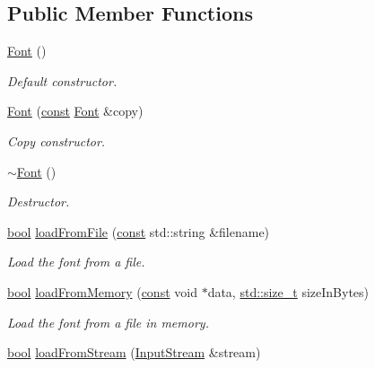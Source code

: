 \subsection*{Public Member Functions}
\begin{DoxyCompactItemize}
\item 
\hyperlink{classsf_1_1_font_a506404655b8869ed60d1e7709812f583}{Font} ()
\begin{DoxyCompactList}\small\item\em Default constructor. \end{DoxyCompactList}\item 
\hyperlink{classsf_1_1_font_a72d7322b355ee2f1be4500f530e98081}{Font} (\hyperlink{term__entry_8h_a57bd63ce7f9a353488880e3de6692d5a}{const} \hyperlink{classsf_1_1_font}{Font} \&copy)
\begin{DoxyCompactList}\small\item\em Copy constructor. \end{DoxyCompactList}\item 
\hyperlink{classsf_1_1_font_aa18a3c62e6e01e9a21c531b5cad4b7f2}{$\sim$\-Font} ()
\begin{DoxyCompactList}\small\item\em Destructor. \end{DoxyCompactList}\item 
\hyperlink{term__entry_8h_a002004ba5d663f149f6c38064926abac}{bool} \hyperlink{classsf_1_1_font_ab020052ef4e01f6c749a85571c0f3fd1}{load\-From\-File} (\hyperlink{term__entry_8h_a57bd63ce7f9a353488880e3de6692d5a}{const} std\-::string \&filename)
\begin{DoxyCompactList}\small\item\em Load the font from a file. \end{DoxyCompactList}\item 
\hyperlink{term__entry_8h_a002004ba5d663f149f6c38064926abac}{bool} \hyperlink{classsf_1_1_font_abf2f8d6de31eb4e1db02e061c323e346}{load\-From\-Memory} (\hyperlink{term__entry_8h_a57bd63ce7f9a353488880e3de6692d5a}{const} void $\ast$data, \hyperlink{nc__alloc_8h_a7b60c5629e55e8ec87a4547dd4abced4}{std\-::size\-\_\-t} size\-In\-Bytes)
\begin{DoxyCompactList}\small\item\em Load the font from a file in memory. \end{DoxyCompactList}\item 
\hyperlink{term__entry_8h_a002004ba5d663f149f6c38064926abac}{bool} \hyperlink{classsf_1_1_font_abc3f37a354ce8b9a21f8eb93bd9fdafb}{load\-From\-Stream} (\hyperlink{classsf_1_1_input_stream}{Input\-Stream} \&stream)

\end{DoxyCompactItemize}
